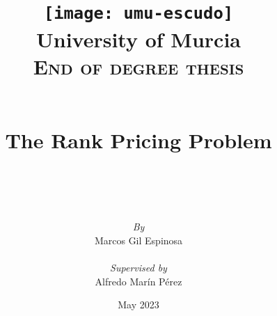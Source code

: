 \title {
    \texttt{[image: umu-escudo]}\\
    \vspace{1cm}
    {
        \Large \textbf{University of Murcia}\\
        \textsc{End of degree thesis}
    }\\
    \vspace{0.5cm}
    \begin{minipage}{10cm}
        \centering
        \hrulefill
    \end{minipage}\\
    \vspace{0.5cm}
    The Rank Pricing Problem\\
    
    \vspace{0.5cm}
    \begin{minipage}{10cm}
        \centering
        \hrulefill
    \end{minipage}\\
}
\author{%
    \large{\textit{By}}\\%
    \large{Marcos Gil Espinosa}\\%
    \\%
    \large{\textit{Supervised by}}\\%
    \large{Alfredo Marín Pérez}%
}
\date{May 2023}
\maketitle
